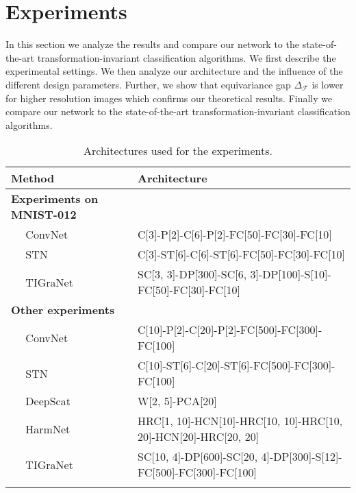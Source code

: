 \documentclass[10pt,journal,compsoc]{IEEEtran}
\newcommand{\mF}{\mathcal{F}}
\begin{document}
	\section{Experiments}
	\label{s:exp}

	In this section we analyze the results and compare our network to the state-of-the-art transformation-invariant classification algorithms. We first describe the experimental settings. We then analyze our architecture and the influence of the different design parameters. Further, we show that equivariance gap $\Delta_\mF$ is lower for higher resolution images which confirms our theoretical results. Finally we compare our network to the state-of-the-art transformation-invariant classification algorithms.

	\begin{table*}[!ht]
		\centering
		\begin{tabularx}{\linewidth}{Xl}
			\toprule
			Method & Architecture \\
			\midrule{\bf Experiments on MNIST-012} & \\
			$\quad$ ConvNet~\cite{bb:lecun} & C[3]-P[2]-C[6]-P[2]-FC[50]-FC[30]-FC[10] \\
			$\quad$ STN~\cite{bb:STN} & C[3]-ST[6]-C[6]-ST[6]-FC[50]-FC[30]-FC[10] \\
			$\quad$ TIGraNet & SC[3, 3]-DP[300]-SC[6, 3]-DP[100]-S[10]-FC[50]-FC[30]-FC[10] \\
			\midrule{\bf Other experiments} & \\
			$\quad$ ConvNet~\cite{bb:lecun} & C[10]-P[2]-C[20]-P[2]-FC[500]-FC[300]-FC[100] \\
			$\quad$ STN~\cite{bb:STN} & C[10]-ST[6]-C[20]-ST[6]-FC[500]-FC[300]-FC[100] \\
			$\quad$ DeepScat~\cite{bb:oyallon2015deep} & W[2, 5]-PCA[20] \\
			$\quad$ HarmNet~\cite{bb:harm}  & HRC[1, 10]-HCN[10]-HRC[10, 10]-HRC[10, 20]-HCN[20]-HRC[20, 20] \\
			$\quad$ TIGraNet & SC[10, 4]-DP[600]-SC[20, 4]-DP[300]-S[12]-FC[500]-FC[300]-FC[100] \\
			\bottomrule
			\\
		\end{tabularx}
		\caption{Architectures used for the experiments.
}
\end{table*}
\end{document}
